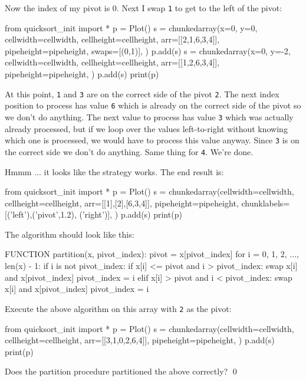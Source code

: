 Now the index of my pivot is 0.
Next I swap \verb!1! to get to the left of the pivot:
\begin{python}
from quicksort_init import *
p = Plot()
s = chunkedarray(x=0, y=0, cellwidth=cellwidth, 
                   cellheight=cellheight,
                   arr=[[2,1,6,3,4]],
                   pipeheight=pipeheight,
                   swaps=[(0,1)],
)
p.add(s)
s = chunkedarray(x=0, y=-2, cellwidth=cellwidth, 
                   cellheight=cellheight,
                   arr=[[1,2,6,3,4]],
                   pipeheight=pipeheight,
)
p.add(s)
print(p)
\end{python}




At this point, \verb!1! and \verb!3! are on the correct side of the 
pivot \verb!2!.
The next index position to process has value \verb!6! which is already
on the correct side of the pivot so we don't do anything.
The next value to process has value \verb!3! which
was actually already processed, but if we loop over the values
left-to-right without knowing which one is processed, we would have to 
process this value anyway.
Since \verb!3! is on the correct side we don't do anything.
Same thing for \verb!4!.
We're done.




Hmmm ... it looks like the strategy works.
The end result is:
\begin{python}
from quicksort_init import *
p = Plot()
s = chunkedarray(cellwidth=cellwidth, 
                   cellheight=cellheight,
                   arr=[[1],[2],[6,3,4]],
                   pipeheight=pipeheight,
                   chunklabels=[('left'),('pivot',1.2), ('right')],
)
p.add(s)
print(p)
\end{python}




The algorithm should look like this:
\begin{console}
FUNCTION partition(x, pivot_index):
    pivot = x[pivot_index]
    for i = 0, 1, 2, ..., len(x) - 1:
        if i is not pivot_index:
            if x[i] <= pivot and i > pivot_index:
                swap x[i] and x[pivot_index]
                pivot_index = i
            elif x[i] > pivot and i < pivot_index:
                swap x[i] and x[pivot_index]
                pivot_index = i
\end{console}



\newpage
\begin{ex}
Execute the above algorithm on this array
with \verb!2! as the pivot:
\begin{python}
from quicksort_init import *
p = Plot()
s = chunkedarray(cellwidth=cellwidth, 
                   cellheight=cellheight,
                   arr=[[3,1,0,2,6,4]],
                   pipeheight=pipeheight,
)
p.add(s)
print(p)
\end{python}
Does the partition procedure partitioned the above correctly?
\qed
\end{ex}



